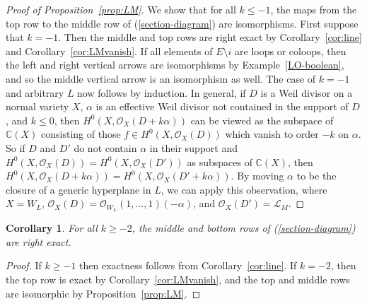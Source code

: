 \documentclass{amsart}
\newtheorem{corollary}[theorem]{Corollary}
\newcommand{\F}{\mathbb{C}}
\theoremstyle{definition}
\begin{document}
\begin{proof}[Proof of Proposition~\ref{prop:LM}]
    We show that for all $k \leq -1$, the maps from the top row to the middle row of  
    (\ref{section-diagram}) are isomorphisms.
    First suppose that $k = -1$. Then the middle and top rows are right exact by 
    Corollary~\ref{cor:line} and Corollary~\ref{cor:LMvanish}. If all 
    elements of $E\setminus i$ are loops or coloops, then the left and right vertical arrows 
    are isomorphisms by Example~\ref{LO-boolean}, and so the middle 
    vertical arrow is an isomorphism as well. The case of $k=-1$ and 
    arbitrary $L$ now follows by induction. In 
    general, if $D$ is a Weil divisor on a normal variety $X$, 
    $\alpha$ is an effective Weil divisor not contained in the support 
    of $D$, and $k \leq 0$, then $H^0(X, \mathcal{O}_{X}(D + 
    k\alpha))$ can be viewed as the subspace of $\F(X)$ consisting of those $f \in 
    H^0(X, \mathcal{O}_X(D))$ which vanish to order $-k$ 
    on $\alpha$. So if $D$ and $D'$ do not contain $\alpha$ in 
    their support and $H^0(X, \mathcal{O}_X(D)) 
    = H^0(X, \mathcal{O}_X(D'))$ as subspaces of $\F(X)$, then $H^0(X, \mathcal{O}_X(D 
    + k\alpha)) = H^0(X, \mathcal{O}_X(D' + k\alpha))$. By moving $\alpha$ 
    to be the closure of a generic hyperplane in $L$, we can apply this 
    observation, where $X = W_L$, $\mathcal{O}_X(D) = 
    \mathcal{O}_{W_L}(1, \ldots, 1)(-\alpha)$, and $\mathcal{O}_X(D') = 
    \mathcal{L}_M$. 
\end{proof}
\begin{corollary}\label{middle-exact}
    For all $k \geq -2$, the middle and bottom rows of 
    (\ref{section-diagram}) are right exact.
\end{corollary}
\begin{proof}
    If $k \geq -1$ then exactness follows from Corollary~\ref{cor:line}. 
    If $k = -2$, then the top row is exact by 
    Corollary~\ref{cor:LMvanish}, and the top and middle rows are 
    isomorphic by Proposition~\ref{prop:LM}.
\end{proof}
\end{document}
